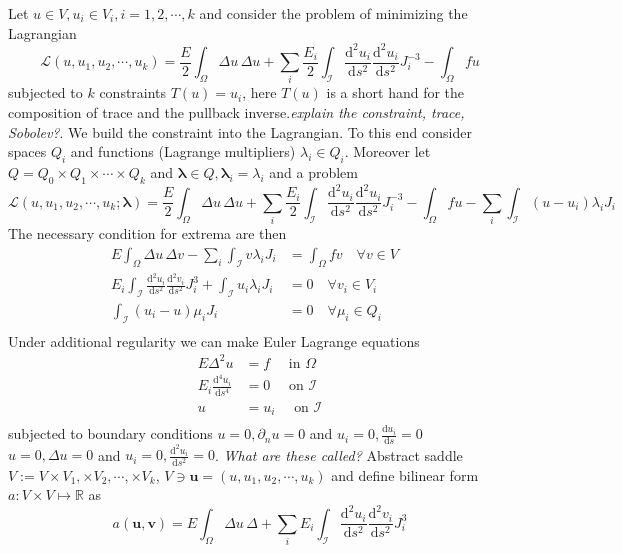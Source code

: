 \documentclass{marine_2015}
\newcommand{\ainner}[2]{\ensuremath{a\left(#1, #2\right)}}
\newcommand{\vvec}[1]{\ensuremath{\pmb{#1}}}
\newcommand{\deriv}[2]{\ensuremath{\frac{\mathrm{d}#1}{\mathrm{d}#2}}}
\newcommand{\tderiv}[2]{\ensuremath{\tfrac{\mathrm{d}#1}{\mathrm{d}#2}}}
\begin{document}
Let $u\in V, u_i\in V_i, i=1, 2, \cdots, k$ and consider the problem of
minimizing the Lagrangian
\[
  \mathcal{L}\left(u, u_1, u_2, \cdots, u_k\right)=
  \frac{E}{2}\displaystyle\int_{\Omega}\Delta u\,\Delta u+
  \sum_i\frac{E_i}{2}\int_{\mathcal{I}}
  \deriv{^2u_i}{s^2}\deriv{^2u_i}{s^2}J_i^{-3}
  -\displaystyle\int_{\Omega}f u
\]
subjected to $k$ constraints
$T(u)=u_i$, here $T(u)$ is a short hand for the composition of trace and the
pullback inverse.\textit{explain the constraint, trace, Sobolev?}.
We build the constraint into the Lagrangian. To this end consider spaces $Q_i$
and functions (Lagrange multipliers) $\lambda_i\in Q_i$. Moreover let
$Q=Q_0\times Q_1\times\cdots\times Q_k$ and $\vvec{\lambda}\in
Q,\vvec{\lambda}_i=\lambda_i$ and a problem
\[
  \mathcal{L}\left(u, u_1, u_2, \cdots, u_k;\vvec{\lambda}\right)=
   \frac{E}{2}\displaystyle\int_{\Omega}\Delta u\,\Delta u+
  \sum_i\frac{E_i}{2}\int_{\mathcal{I}}
  \deriv{^2u_i}{s^2}\deriv{^2u_i}{s^2}J_i^{-3}
  -\displaystyle\int_{\Omega}f u - \sum_i\int_{\mathcal{I}}\left(u-u_i\right)\lambda_i J_i
\]
The necessary condition for extrema are then
\[
  \begin{aligned}
    E\displaystyle\int_{\Omega}\Delta u\,\Delta v- \sum_i\int_{\mathcal{I}}v\lambda_i J_i
    &=\displaystyle\int_{\Omega}f v\quad\forall v\in V& \\
  E_i\displaystyle\int_{\mathcal{I}} \deriv{^2u_i}{s^2}\deriv{^2v_i}{s^2}J_i^3 +
  \int_{\mathcal{I}} u_i \lambda_i J_i &= 0\quad\forall v_i\in V_i&\\
  \int_{\mathcal{I}}\left(u_i-u\right)\mu_i J_i &= 0\quad\forall \mu_i\in Q_i&\\
  \end{aligned}
\]
Under additional regularity we can make Euler Lagrange equations
\[
  \begin{aligned}
    E\Delta^2u &= f\quad\text{ in }\Omega\\
    E_i\deriv{^4 u_i}{s^4} &= 0\quad\text{ on }\mathcal{I}\\
    u &= u_i\quad\text{ on }\mathcal{I}\\
  \end{aligned}
\]
subjected to boundary conditions $u=0, \partial_nu=0$ and $u_i=0, \tderiv{u_i}{s}=0$
$u=0, \Delta u=0$ and $u_i=0, \tderiv{^2u_i}{s^2}=0$. \textit{What are these called?}
Abstract saddle $V:=V\times V_1, \times V_2, \cdots, \times V_k$,
$V\ni\vvec{u}=\left(u, u_1, u_2, \cdots, u_k\right)$ and define bilinear form
$a:V\times V\mapsto\mathbb{R}$ as
\[
  \ainner{\vvec{u}}{\vvec{v}} = 
  E\displaystyle\int_{\Omega}\Delta u\,\Delta+
  \sum_iE_i\displaystyle\int_{\mathcal{I}} \deriv{^2u_i}{s^2}\deriv{^2v_i}{s^2}J_i^3
\]
\end{document}
